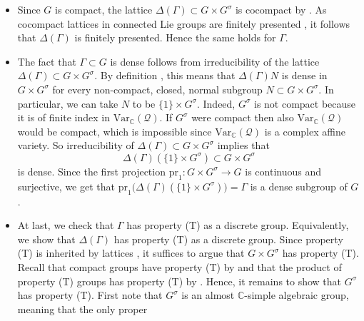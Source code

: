 \documentclass[11pt, letterpaper, oneside,reqno]{amsart}
\theoremstyle{plain}
\theoremstyle{underline}
\theoremstyle{definition}
\theoremstyle{remark}
\begin{document}
	\begin{itemize}
		\item Since $G$ is compact, the lattice $\Delta(\Gamma)\subset G\times G^{\sigma}$ is cocompact by \cite[Cor.~5.5.10]{Witte}. As cocompact lattices in connected Lie groups are finitely presented \cite[Thm.~6.15]{Rag}, it follows that $\Delta(\Gamma)$ is finitely presented. Hence the same holds for $\Gamma$.
		\item The fact that $\Gamma\subset G$ is dense follows from irreducibility of the lattice $\Delta(\Gamma)\subset G\times G^{\sigma}$. By definition \cite[Def.~4.3.1]{Witte}, this means that $\Delta(\Gamma)N$ is dense in $G\times G^{\sigma}$ for every non-compact, closed, normal subgroup $N\subset G\times G^{\sigma}$. In particular, we can take $N$ to be $\{1\}\times G^{\sigma}$. Indeed, $G^{\sigma}$ is not compact because it is of finite index in $\text{Var}_{\mathbb{C}}(\mathcal{Q})$. If $G^{\sigma}$ were compact then also $\text{Var}_{\mathbb{C}}(\mathcal{Q})$ would be compact, which is impossible since $\text{Var}_{\mathbb{C}}(\mathcal{Q})$ is a complex affine variety. So irreducibility of $\Delta(\Gamma)\subset G\times G^{\sigma}$ implies that 
		\[
		\Delta(\Gamma)(\{1\}\times G^{\sigma})\subset G\times G^{\sigma}
		\]
		is dense. Since the first projection $\text{pr}_1:G\times G^{\sigma}\rightarrow G$ is continuous and surjective, we get that
		$
		\text{pr}_1\big(\Delta(\Gamma)(\{1\}\times G^{\sigma})\big)=\Gamma
		$
		is a dense subgroup of $G$.
		\item At last, we check that $\Gamma$ has property (T) as a discrete group. Equivalently, we show that $\Delta(\Gamma)$ has property (T) as a discrete group. Since property (T) is inherited by lattices \cite[Thm.~1.7.1]{Kazhdan}, it suffices to argue that $G\times G^{\sigma}$ has property (T). Recall that compact groups have property (T) by \cite[Prop.~1.1.5]{Kazhdan} and that the product of property (T) groups has property (T) by \cite[Prop.~1.7.8]{Kazhdan}. Hence, it remains to show that $G^{\sigma}$ has property (T). First note that $G^{\sigma}$ is an almost $\mathbb{C}$-simple algebraic group, meaning that the only proper

\end{itemize}
\end{document}
